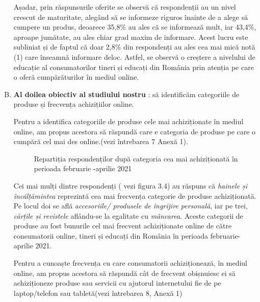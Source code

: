 \documentclass[a4paper, 12pt]{article}
\begin{document}
\begin{enumerate}[(A)]
	 	\qquad Așadar, prin răspunsurile oferite se observă că respondenții  au un nivel crescut de maturitate, alegând să se informeze riguros înainte de a alege să cumpere un produs, deoarece  35,8\% au ales că se informează mult, iar 43,4\%, aproape jumătate, au ales chiar grad maxim de informare. Acest lucru este subliniat și de faptul că doar 2,8\% din respondenți au ales cea mai mică notă (1) care înseamnă informare deloc. Astfel, se observă o creștere a nivelului de educație al consumatorilor tineri și educați din România prin atenția pe care o oferă cumpărăturilor în mediul online.

	 	
		\item \textbf{Al doilea obiectiv al studiului nostru }: să identificăm categoriile de produse și frecvența achizițiilor online.
		
		\qquad Pentru a identifica categoriile de produse cele mai achiziționate în mediul online, am propus acestora să răspundă care e categoria de produse pe care o cumpără cel mai des online.(vezi întrebarea 7 Anexă 1).
		\begin{figure}[!htb]
			\centering
			\caption{Repartiția respondenților după categoria cea mai achiziționată în perioada februarie -aprilie 2021} 
		\end{figure}
	
		\qquad Cei mai mulți dintre respondenți ( vezi figura 3.4) au răspuns că\textit{ hainele și încălțămintea} reprezintă cea mai frecvența categorie de produse achiziționată. Pe locul doi se află \textit{accesoriile/ produsele de îngrijire personală}, iar pe trei,\textit{ cărțile și revistele} aflându-se la egalitate cu \textit{mâncarea}. Aceste categorii de produse au fost bunurile cel mai frecvent achiziționate online de către  consumatorii online, tineri și educați din România în perioada februarie-aprilie 2021.
	
		\qquad Pentru a cunoaște frecvența  cu care consumatorii achiziționează, în mediul  online, am propus acestora să răspundă cât de frecvent obișnuiesc ei să achiziționeze produse sau servicii cu ajutorul internetului fie de pe laptop/telefon sau tabletă(vezi întrebarea 8, Anexă 1)
		\begin{figure}[!htb]
			\centering
			\begin{tikzpicture}
				

\end{tikzpicture}
\end{figure}
\end{enumerate}
\end{document}
